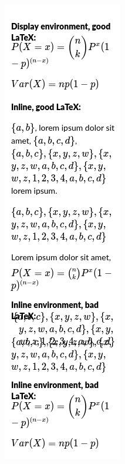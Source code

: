\documentclass[main.tex]{subfiles}
\begin{document}
\begin{figure}[H]
\includegraphics[scale=0.43]{images/solution5.png}

\end{figure}
\end{document}
